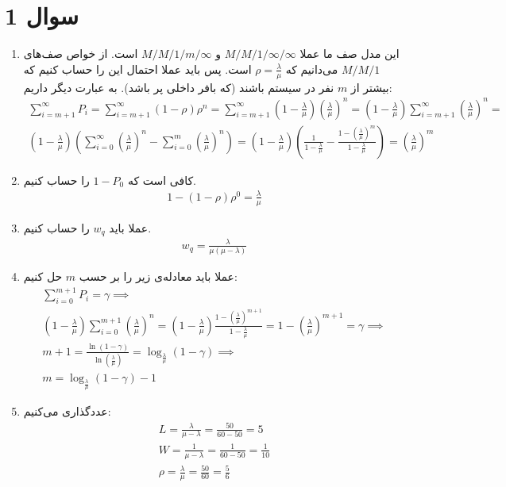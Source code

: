 \section*{سوال 1}
\begin{enumerate}
    \item این مدل صف ما عملا
    $M/M/1/\infty/\infty$
    و
    $M/M/1/m/\infty$
    است. از خواص صف‌های
    $M/M/1$
    می‌دانیم که
    $\rho = \frac{\lambda}{\mu}$
    است. پس باید عملا احتمال این را حساب کنیم که بیشتر از
    $m$
    نفر در سیستم باشند (که بافر داخلی پر باشد). به عبارت دیگر داریم:
    \begin{gather*}
        \sum_{i=m+1}^{\infty} P_i = \sum_{i=m+1}^{\infty} (1 - \rho) \rho^n = \sum_{i=m+1}^{\infty} (1 - \frac{\lambda}{\mu}) (\frac{\lambda}{\mu})^n = (1 - \frac{\lambda}{\mu}) \sum_{i=m+1}^{\infty} (\frac{\lambda}{\mu})^n =\\
        (1 - \frac{\lambda}{\mu}) (\sum_{i=0}^{\infty} (\frac{\lambda}{\mu})^n - \sum_{i=0}^{m} (\frac{\lambda}{\mu})^n) = (1 - \frac{\lambda}{\mu}) (\frac{1}{1 - \frac{\lambda}{\mu}} - \frac{1 - (\frac{\lambda}{\mu})^m}{1 - \frac{\lambda}{\mu}}) = (\frac{\lambda}{\mu})^m
    \end{gather*}
    \item کافی است که $1 - P_0$ را حساب کنیم.
    \begin{gather*}
        1 - (1 - \rho) \rho^0 = \frac{\lambda}{\mu}
    \end{gather*}
    \item عملا باید $w_q$ را حساب کنیم.
    \begin{gather*}
        w_q = \frac{\lambda}{\mu(\mu - \lambda)}
    \end{gather*}
    \item عملا باید معادله‌ی زیر را بر حسب
    $m$
    حل کنیم:
    \begin{gather*}
        \sum_{i=0}^{m+1} P_i = \gamma \implies\\
        (1 - \frac{\lambda}{\mu}) \sum_{i=0}^{m+1} (\frac{\lambda}{\mu})^n = (1 - \frac{\lambda}{\mu}) \frac{1 - (\frac{\lambda}{\mu})^{m+1}}{1 - \frac{\lambda}{\mu}} = 1 - (\frac{\lambda}{\mu})^{m+1} = \gamma \implies\\
        m + 1 = \frac{\ln (1 - \gamma)}{\ln (\frac{\lambda}{\mu})} = \log_{\frac{\lambda}{\mu}} (1 - \gamma) \implies\\
        m = \log_{\frac{\lambda}{\mu}} (1 - \gamma) - 1
    \end{gather*}
    \item عددگذاری می‌کنیم:
    \begin{gather*}
        L = \frac{\lambda}{\mu - \lambda} = \frac{50}{60 - 50} = 5\\
        W = \frac{1}{\mu - \lambda} = \frac{1}{60 - 50} = \frac{1}{10}\\
        \rho = \frac{\lambda}{\mu} = \frac{50}{60} = \frac{5}{6}
    \end{gather*}
\end{enumerate}



